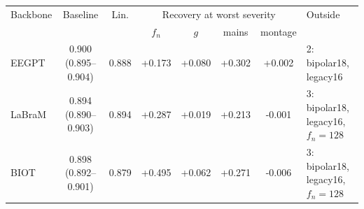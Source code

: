 \begin{tabular}{lccccccl}
\toprule
Backbone & Baseline & Lin. & \multicolumn{4}{c}{Recovery at worst severity} & Outside \\
& & & $f_n$ & $g$ & mains & montage & \\
\midrule
EEGPT & 0.900 (0.895--0.904) & 0.888 & +0.173 & +0.080 & +0.302 & +0.002 & 2: bipolar18, legacy16 \\
LaBraM & 0.894 (0.890--0.903) & 0.894 & +0.287 & +0.019 & +0.213 & -0.001 & 3: bipolar18, legacy16, $f_n{=}128$ \\
BIOT & 0.898 (0.892--0.901) & 0.879 & +0.495 & +0.062 & +0.271 & -0.006 & 3: bipolar18, legacy16, $f_n{=}128$ \\
\bottomrule
\end{tabular}

